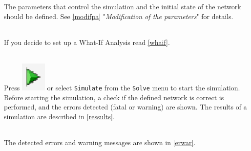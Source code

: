 
The parameters that control the simulation and the initial state
of the network should be defined. See \autoref{modifpa}
"\emph{Modification of the parameters}" for details.

\\
If you decide to set up a What-If Analysis read
\autoref{whaif}.

\\
Press
\includegraphics[scale=.5]{img/jsimg/play} or select
\texttt{Simulate} from the \texttt{Solve} menu to start the
simulation.  Before starting the simulation, a check if the
defined network is correct is performed, and the errors detected
(fatal or warning) are shown.  The results of a simulation are
described in \autoref{ressults}.

\\
The detected errors and warning messages are shown in
\autoref{erwar}.\\



